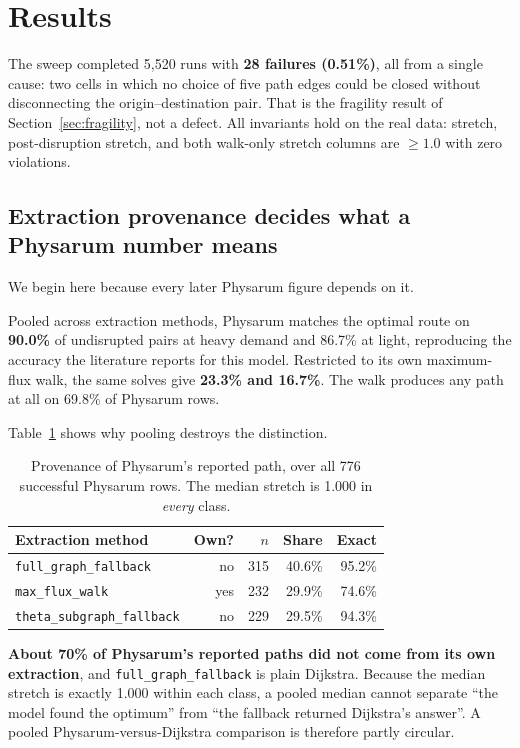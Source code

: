 \section{Results}
\label{sec:results}

The sweep completed 5{,}520 runs with \textbf{28 failures (0.51\%)}, all from
a single cause: two cells in which no choice of five path edges could be
closed without disconnecting the origin--destination pair. That is the
fragility result of Section~\ref{sec:fragility}, not a defect. All
invariants hold on the real data: stretch, post-disruption stretch, and both
walk-only stretch columns are $\geq 1.0$ with zero violations.

\subsection{Extraction provenance decides what a Physarum number means}
\label{sec:provenance}

We begin here because every later Physarum figure depends on it.

Pooled across extraction methods, Physarum matches the optimal route on
\textbf{90.0\%} of undisrupted pairs at heavy demand and 86.7\% at light, reproducing the accuracy the literature reports for this model. Restricted to
its own maximum-flux walk, the same solves give \textbf{23.3\% and 16.7\%}.
The walk produces any path at all on 69.8\% of Physarum rows.

Table~\ref{tab:provenance} shows why pooling destroys the distinction.

\begin{table}[t]
\caption{Provenance of Physarum's reported path, over all 776 successful
Physarum rows. The median stretch is 1.000 in \emph{every} class.}
\label{tab:provenance}
\centering
\begin{tabular}{lrrrr}
\toprule
Extraction method & Own? & $n$ & Share & Exact \\
\midrule
\texttt{full\_graph\_fallback}     & no  & 315 & 40.6\% & 95.2\% \\
\texttt{max\_flux\_walk}           & yes & 232 & 29.9\% & 74.6\% \\
\texttt{theta\_subgraph\_fallback} & no  & 229 & 29.5\% & 94.3\% \\
\bottomrule
\end{tabular}
\end{table}

\textbf{About 70\% of Physarum's reported paths did not come from its own
extraction}, and \texttt{full\_graph\_fallback} is plain Dijkstra. Because
the median stretch is exactly 1.000 within each class, a pooled median cannot
separate ``the model found the optimum'' from ``the fallback returned
Dijkstra's answer''. A pooled Physarum-versus-Dijkstra comparison is
therefore partly circular.

